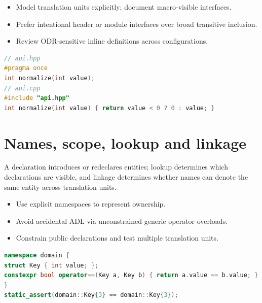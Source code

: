 \documentclass[11pt]{article}
\begin{document}
\begin{itemize}[leftmargin=*,itemsep=1pt,topsep=3pt]
\item Model translation units explicitly; document macro-visible interfaces.
\item Prefer intentional header or module interfaces over broad transitive inclusion.
\item Review ODR-sensitive inline definitions across configurations.
\end{itemize}
\begin{lstlisting}[language=C++]
// api.hpp
#pragma once
int normalize(int value);
// api.cpp
#include "api.hpp"
int normalize(int value) { return value < 0 ? 0 : value; }
\end{lstlisting}
\section{Names, scope, lookup and linkage}
A declaration introduces or redeclares entities; lookup determines which declarations are visible, and linkage determines whether names can denote the same entity across translation units.

\begin{itemize}[leftmargin=*,itemsep=1pt,topsep=3pt]
\item Use explicit namespaces to represent ownership.
\item Avoid accidental ADL via unconstrained generic operator overloads.
\item Constrain public declarations and test multiple translation units.
\end{itemize}
\begin{lstlisting}[language=C++]
namespace domain {
struct Key { int value; };
constexpr bool operator==(Key a, Key b) { return a.value == b.value; }
}
static_assert(domain::Key{3} == domain::Key{3});
\end{lstlisting}
\end{document}
